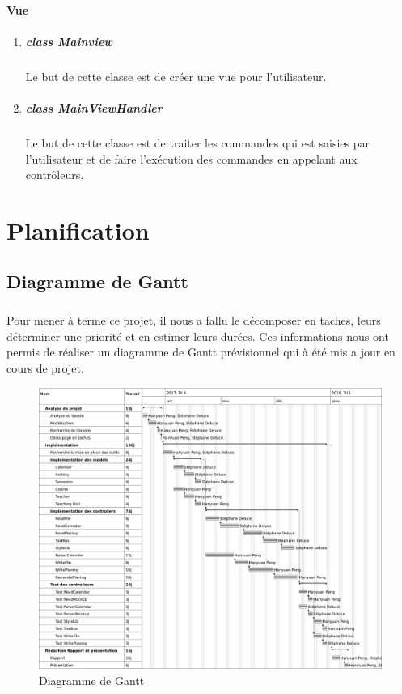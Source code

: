 \documentclass{polytech/polytech}
\begin{document}
	\subsubsection{Vue}
	\begin{enumerate}
		\item \paragraph{class Mainview}
		Le but de cette classe est de créer une vue pour l'utilisateur.

		\item \paragraph{class MainViewHandler}
		Le but de cette classe est de traiter les commandes qui est saisies par l'utilisateur et de faire l'exécution des commandes en appelant aux contrôleurs.
	\end{enumerate}
	\chapter{Planification}

	\section{Diagramme de Gantt}

	\paragraph{}
	Pour mener à terme ce projet, il nous a fallu le décomposer en taches, leurs déterminer une priorité et en estimer leurs durées.
	Ces informations nous ont permis de réaliser un diagramme de Gantt prévisionnel qui à été mis a jour en cours de projet.
	
	\begin{figure}
		\caption{Diagramme de Gantt}
		\includegraphics[width=13.5cm]{./img/Gantt.png}
	\end{figure}
\end{document}

